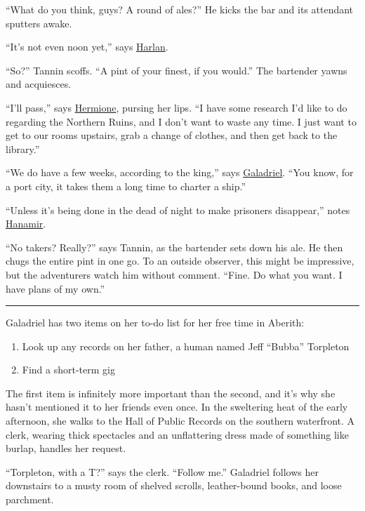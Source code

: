 \documentclass[smalldemyvopaper,11pt,twoside,onecolumn,openright,extrafontsizes]{memoir}
\begin{document}
``What do you think, guys? A round of ales?'' He kicks the bar and its
attendant sputters awake.

``It's not even noon yet,'' says \href{/characters/harlan/}{Harlan}.

``So?'' Tannin scoffs. ``A pint of your finest, if you would.'' The
bartender yawns and acquiesces.

``I'll pass,'' says \href{/characters/hermione/}{Hermione}, pursing her
lips. ``I have some research I'd like to do regarding the Northern
Ruins, and I don't want to waste any time. I just want to get to our
rooms upstairs, grab a change of clothes, and then get back to the
library.''

``We do have a few weeks, according to the king,'' says
\href{/characters/galadriel/}{Galadriel}. ``You know, for a port city,
it takes them a long time to charter a ship.''

``Unless it's being done in the dead of night to make prisoners
disappear,'' notes \href{/characters/hanamir/}{Hanamir}.

``No takers? Really?'' says Tannin, as the bartender sets down his ale.
He then chugs the entire pint in one go. To an outside observer, this
might be impressive, but the adventurers watch him without comment.
``Fine. Do what you want. I have plans of my own.''

\begin{center}\rule{0.5\linewidth}{\linethickness}\end{center}

Galadriel has two items on her to-do list for her free time in Aberith:

\begin{enumerate}
\def\labelenumi{\arabic{enumi}.}
\item
  Look up any records on her father, a human named Jeff ``Bubba''
  Torpleton
\item
  Find a short-term gig
\end{enumerate}

The first item is infinitely more important than the second, and it's
why she hasn't mentioned it to her friends even once. In the sweltering
heat of the early afternoon, she walks to the Hall of Public Records on
the southern waterfront. A clerk, wearing thick spectacles and an
unflattering dress made of something like burlap, handles her request.

``Torpleton, with a T?'' says the clerk. ``Follow me.'' Galadriel
follows her downstairs to a musty room of shelved scrolls, leather-bound
books, and loose parchment.
\end{document}
